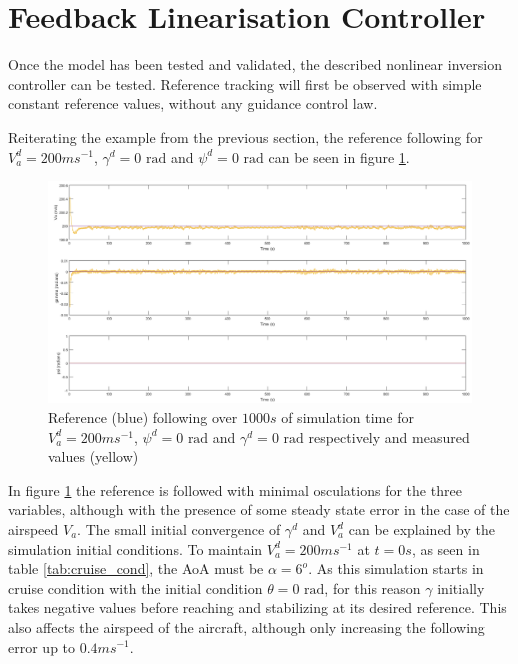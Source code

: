 \section{Feedback Linearisation Controller}
\label{section:results/fl_contro}

Once the model has been tested and validated, the described nonlinear inversion controller can be tested. Reference tracking will first be observed with simple constant reference values, without any guidance control law. 

Reiterating the example from the previous section, the reference following for $V_a^d=200 ms^{-1}$, $\gamma^d = 0\text{ rad}$ and $\psi^d = 0\text{ rad}$ can be seen in figure \ref{fig:const_ref}.
\begin{figure}[h]
\centering
\includegraphics[width=1.1\textwidth]{Figures/Results/nli_test_const.png}
\caption[Constant heading reference following of feedback linearisation controller]{Reference (blue) following over $1000s$ of simulation time for $V_a^d=200 ms^{-1}$, $\psi^d = 0\text{ rad}$ and $\gamma^d = 0\text{ rad}$ respectively and measured values (yellow)}
\label{fig:const_ref}
\end{figure}

In figure \ref{fig:const_ref} the reference is followed with minimal osculations for the three variables, although with the presence of some steady state error in the case of the airspeed $V_a$. The small initial convergence of $\gamma^d$ and $V_a^d$ can be explained by the simulation initial conditions. To maintain $V_a^d=200ms^{-1}$ at $t=0s$, as seen in table \ref{tab:cruise_cond}, the AoA must be $\alpha=6^o$. As this simulation starts in cruise condition with the initial condition $\theta=0 \text{ rad}$, for this reason $\gamma$ initially takes negative values before reaching and stabilizing at its desired reference. This also affects the airspeed of the aircraft, although only increasing the following error up to $0.4ms^{-1}$.

